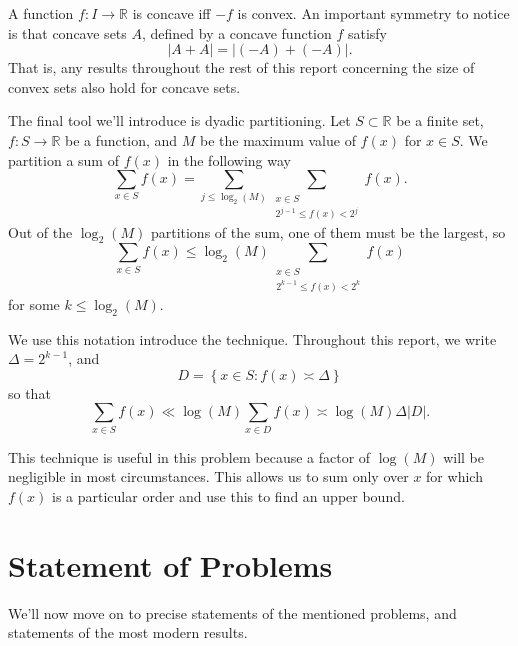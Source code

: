 \documentclass[12pt,reqno]{amsart}
\begin{document}
A function \(f: I \to \mathbb{R} \) is concave iff \(-f\) is convex.
An important symmetry to notice is that concave sets \(A\), defined by a 
concave function \(f\) satisfy
\[
    \left\lvert A + A \right\rvert = \left\lvert \left( -A \right) + \left( -A \right)  \right\rvert 
.\]
That is, any results throughout the rest of this report concerning the size of convex
sets also hold for concave sets.

The final tool we'll introduce is dyadic partitioning. Let \(S \subset \mathbb{R} \) be a finite set, \(f: S \to \mathbb{R} \) be a function,
and \(M\) be the maximum value of \(f(x)\) for \(x \in S\). We partition a sum of
\(f(x)\) in the following way
\[
    \sum _{x \in S} f(x) = \sum _{j \leq \log _{2} \left( M \right)} \sum _{\substack{ x \in S \\ 2^{j-1} \leq f(x) < 2^{j} }} f(x)
.\]
Out of the \(\log _{2} \left( M \right) \) partitions of the sum, one of them must be the largest, so
\[
    \sum _{x \in S} f(x) \leq  \log _{2} \left( M \right)  \sum _{\substack{ x \in S \\ 2^{k-1} \leq f(x) < 2^{k} }} f(x)
\]
for some \(k \leq \log _{2} \left( M \right) \).

We use this notation introduce the technique. Throughout this report, we write
\(\Delta= 2^{k-1}\), and
\[
    D =\left\{ x \in S : f(x) \asymp \Delta\right\} 
\]
so that
\[
    \sum _{x \in S} f(x) \ll \log \left( M \right) \sum _{x \in D} f(x)\asymp \log \left( M \right) \Delta \left\lvert D \right\rvert 
.\]

This technique is useful in this problem because a factor of \(\log \left( M \right) \) will
be negligible in most circumstances. This allows us to sum only over \(x\) for which \(f(x)\) is
a particular order and use this to find an upper bound.




\section{Statement of Problems}

We'll now move on to precise statements of the mentioned problems, and statements of the most modern results.
\end{document}
